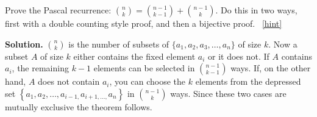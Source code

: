 \documentclass{book}
\begin{document}
\setcounter{project}{99}
\addtocounter{project}{-1}
\begin{activity}[]\label{activity-92}
\hypertarget{p-738}{}%
Prove the Pascal recurrence: \(\binom{n}{k} = \binom{n - 1}{k-1} + \binom{n - 1}{k}\).  Do this in two ways, first with a double counting style proof, and then a bijective proof.%
~\hfill{\tiny\hyperlink{a-99}{[hint]}\hypertarget{q-99}{}}\par\smallskip%
\noindent\textbf{Solution.}\hypertarget{solution-73}{}\quad%
\hypertarget{p-740}{}%
 \(\binom{n}{k}\) is the number of subsets of \(\{ a_{1},a_{2},a_{3},\ldots,a_{n}\}\) of size \(k\). Now a subset \(A\) of size \(k\) either contains the fixed element \(a_{i}\) or it does not. If \(A\) contains \(a_{i}\), the remaining \(k - 1\) elements can be selected in \(\binom{n - 1}{k - 1}\) ways. If, on the other hand, \(A\) does not contain \(a_{i}\), you can choose the \(k\) elements from the depressed set \(\left\{ a_{1},a_{2},\ldots,a_{i - 1,}a_{i + 1,\ldots,}a_{n} \right\}\) in \(\binom{n - 1}{k}\) ways. Since these two cases are mutually exclusive the theorem follows.%
\end{activity}
\end{document}
